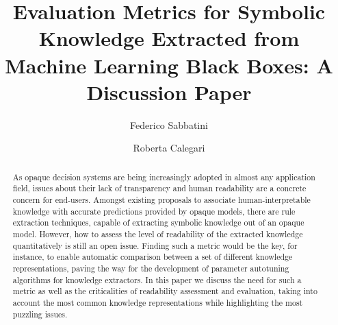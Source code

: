 \documentclass[sigconf]{acmart}
\begin{document}
\title{Evaluation Metrics for Symbolic Knowledge Extracted from Machine Learning Black Boxes: A Discussion Paper}

\author{Federico Sabbatini}

\author{Roberta Calegari}

\renewcommand{\shortauthors}{F. Sabbatini, R. Calegari}

\begin{abstract}
  As opaque decision systems are being increasingly adopted in almost any application field, issues about their lack of transparency and human readability are a concrete concern for end-users.
  Amongst existing proposals to associate human-interpretable knowledge with accurate predictions provided by opaque models, there are rule extraction techniques, capable of extracting symbolic knowledge out of an opaque model.
  However, how to assess the level of readability of the extracted knowledge quantitatively is still an open issue.
  Finding such a metric would be the key, for instance, to enable automatic comparison between a set of different knowledge representations, paving the way for the development of parameter autotuning algorithms for knowledge extractors.
  In this paper we discuss the need for such a metric as well as the criticalities of readability assessment and evaluation, taking into account the most common knowledge representations while highlighting the most puzzling issues.
\end{abstract}
\end{document}

